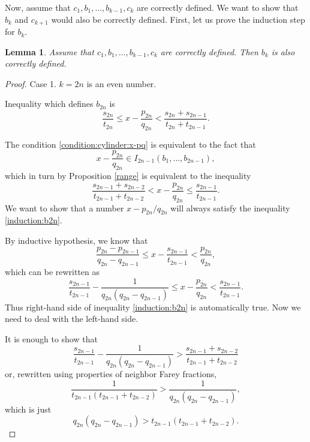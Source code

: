 \documentclass{amsart}
\newtheorem{lemma}[theorem]{Lemma}
\theoremstyle{definition}
\newcommand{\0}{\mbf 0}%
\begin{document}
Now, assume that $c_1,b_1,\ldots,b_{k-1},c_{k}$ are correctly defined. We want to show that $b_{k}$ and $c_{k+1}$ would also be correctly defined. First, let us prove the induction step for $b_k$.

\begin{lemma}\label{bk_correctly_defined}
    Assume that $c_1,b_1,\ldots,b_{k-1},c_k$ are correctly defined. Then $b_k$ is also correctly defined.
\end{lemma}

\begin{proof}
Case 1. $k=2n$ is an even number. 

Inequality which defines $b_{2n}$ is 
\begin{equation}\label{deff:b2n}
\frac{s_{2n}}{t_{2n}} \leq x - \frac{p_{2n}}{q_{2n}} < \frac{s_{2n}+s_{2n-1}}{t_{2n}+t_{2n-1}}.
\end{equation}

The condition \eqref{condition:cylinder:x-pq} is equivalent to the fact that 
$$
x-\frac{p_{2n}}{q_{2n}} \in I_{2n-1}(b_1,\ldots,b_{2n-1}),
$$
which in turn by Proposition \ref{range} is equivalent to the inequality
\begin{equation}\label{induction:b2n}
\frac{s_{2n-1}+s_{2n-2}}{t_{2n-1}+t_{2n-2}} < x - \frac{p_{2n}}{q_{2n}} \leq \frac{s_{2n-1}}{t_{2n-1}}.
\end{equation}
We want to show that a number $x-p_{2n}/q_{2n}$ will always satisfy the inequality \eqref{induction:b2n}.

By inductive hypothesis, we know that
$$
\frac{p_{2n}-p_{2n-1}}{q_{2n}-q_{2n-1}} \leq x - \frac{s_{2n-1}}{t_{2n-1}} < \frac{p_{2n}}{q_{2n}},
$$
which can be rewritten as 
$$
\frac{s_{2n-1}}{t_{2n-1}} - \frac{1}{q_{2n}(q_{2n}-q_{2n-1})} \leq x - \frac{p_{2n}}{q_{2n}} < \frac{s_{2n-1}}{t_{2n-1}}.
$$
Thus right-hand side of inequality \eqref{induction:b2n} is automatically true. Now we need to deal with the left-hand side.

It is enough to show that
$$
\frac{s_{2n-1}}{t_{2n-1}} - \frac{1}{q_{2n}(q_{2n}-q_{2n-1})} > \frac{s_{2n-1}+s_{2n-2}}{t_{2n-1}+t_{2n-2}}
$$
or, rewritten using properties of neighbor Farey fractions,
\begin{equation}
\frac{1}{t_{2n-1}(t_{2n-1}+t_{2n-2})} > \frac{1}{q_{2n}(q_{2n}-q_{2n-1})},
\end{equation}
which is just
\begin{equation}\label{induction:b2n:final}
q_{2n}(q_{2n}-q_{2n-1}) >t_{2n-1}(t_{2n-1}+t_{2n-2}).
\end{equation}



\end{proof}
\end{document}
